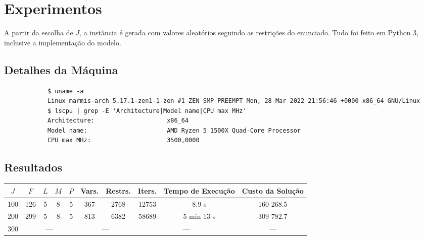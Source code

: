 \section{Experimentos}

    A partir da escolha de $J$, a instância é gerada com valores aleatórios seguindo as restrições do enunciado. Tudo foi feito em Python 3, inclusive a implementação do modelo.

    \subsection{Detalhes da Máquina}

        \begin{verbatim}
            $ uname -a
            Linux marmis-arch 5.17.1-zen1-1-zen #1 ZEN SMP PREEMPT Mon, 28 Mar 2022 21:56:46 +0000 x86_64 GNU/Linux
            $ lscpu | grep -E 'Architecture|Model name|CPU max MHz'
            Architecture:                    x86_64
            Model name:                      AMD Ryzen 5 1500X Quad-Core Processor
            CPU max MHz:                     3500,0000
        \end{verbatim}

    \subsection{Resultados}

        \begin{table}[H]
            \centering
            \begin{tabular}{ccccc|cc|cc|c}
                \toprule\toprule
                $J$ & $F$ & $L$ & $M$ & $P$ & Vars. & Restrs. & Iters. & Tempo de Execução & Custo da Solução \\
                \midrule
                100 & 126 & 5 & 8 & 5 & 367 & 2768 & 12753 & 8.9 s & 160 268.5 \\
                200 & 299 & 5 & 8 & 5 & 813 & 6382 & 58689 & 5 min 13 s & 309 782.7 \\
                300 & \multicolumn{4}{c|}{---} & \multicolumn{2}{c|}{---} & \multicolumn{2}{c|}{---} & --- \\
                \bottomrule\bottomrule
            \end{tabular}
        \end{table}
